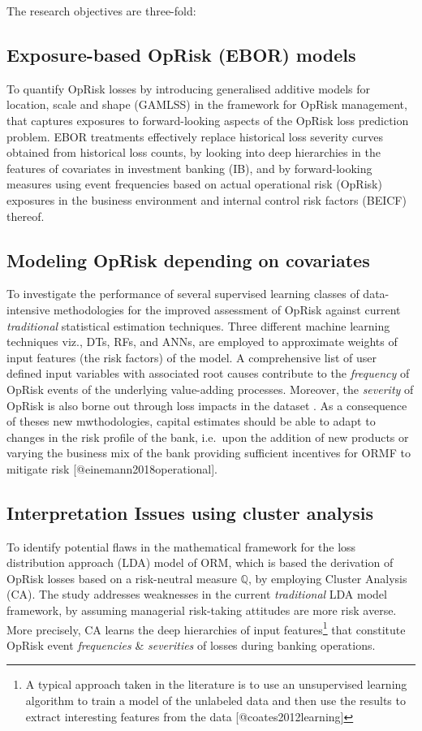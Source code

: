 \documentclass[
]{article}
\begin{document}
The research objectives are three-fold:

\subsection{Exposure-based OpRisk (EBOR) models}

To quantify OpRisk losses by introducing generalised additive models for
location, scale and shape (GAMLSS) in the framework for OpRisk
management, that captures exposures to forward-looking aspects of the
OpRisk loss prediction problem. EBOR treatments effectively replace
historical loss severity curves obtained from historical loss counts, by
looking into deep hierarchies in the features of covariates in
investment banking (IB), and by forward-looking measures using event
frequencies based on actual operational risk (OpRisk) exposures in the
business environment and internal control risk factors (BEICF) thereof.

\subsection{Modeling OpRisk depending on covariates}

To investigate the performance of several supervised learning classes of
data-intensive methodologies for the improved assessment of OpRisk
against current \emph{traditional} statistical estimation techniques.
Three different machine learning techniques viz., DTs, RFs, and ANNs,
are employed to approximate weights of input features (the risk factors)
of the model. A comprehensive list of user defined input variables with
associated root causes contribute to the \emph{frequency} of OpRisk
events of the underlying value-adding processes. Moreover, the
\emph{severity} of OpRisk is also borne out through loss impacts in the
dataset . As a consequence of theses new mwthodologies, capital
estimates should be able to adapt to changes in the risk profile of the
bank, i.e.~upon the addition of new products or varying the business mix
of the bank providing sufficient incentives for ORMF to mitigate risk
{[}@einemann2018operational{]}.

\subsection{Interpretation Issues using cluster analysis}

To identify potential flaws in the mathematical framework for the loss
distribution approach (LDA) model of ORM, which is based the derivation
of OpRisk losses based on a risk-neutral measure \(\mathbb{Q}\), by
employing Cluster Analysis (CA). The study addresses weaknesses in the
current \emph{traditional} LDA model framework, by assuming managerial
risk-taking attitudes are more risk averse. More precisely, CA learns
the deep hierarchies of input
features\footnote{A typical approach taken in the literature is to use an unsupervised learning algorithm to train a model of the unlabeled data and then use the results to extract interesting features from the data [@coates2012learning]}
that constitute OpRisk event \emph{frequencies} \& \emph{severities} of
losses during banking operations.\medskip
\end{document}
